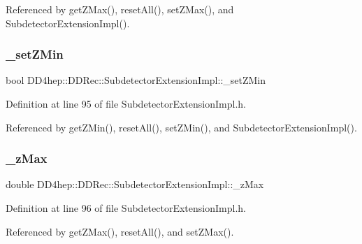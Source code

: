 Referenced by get\+Z\+Max(), reset\+All(), set\+Z\+Max(), and Subdetector\+Extension\+Impl().

\hypertarget{class_d_d4hep_1_1_d_d_rec_1_1_subdetector_extension_impl_a7f2f6db8f2c5f98b732bcea3a452a12f}{}\label{class_d_d4hep_1_1_d_d_rec_1_1_subdetector_extension_impl_a7f2f6db8f2c5f98b732bcea3a452a12f} 
\subsubsection{\texorpdfstring{\+\_\+set\+Z\+Min}{\_setZMin}}
{\footnotesize\ttfamily bool D\+D4hep\+::\+D\+D\+Rec\+::\+Subdetector\+Extension\+Impl\+::\+\_\+set\+Z\+Min\hspace{0.3cm}{\ttfamily [protected]}}



Definition at line 95 of file Subdetector\+Extension\+Impl.\+h.



Referenced by get\+Z\+Min(), reset\+All(), set\+Z\+Min(), and Subdetector\+Extension\+Impl().

\hypertarget{class_d_d4hep_1_1_d_d_rec_1_1_subdetector_extension_impl_aa8e755cc627d81013fb4e3501fdbe172}{}\label{class_d_d4hep_1_1_d_d_rec_1_1_subdetector_extension_impl_aa8e755cc627d81013fb4e3501fdbe172} 
\subsubsection{\texorpdfstring{\+\_\+z\+Max}{\_zMax}}
{\footnotesize\ttfamily double D\+D4hep\+::\+D\+D\+Rec\+::\+Subdetector\+Extension\+Impl\+::\+\_\+z\+Max\hspace{0.3cm}{\ttfamily [protected]}}



Definition at line 96 of file Subdetector\+Extension\+Impl.\+h.



Referenced by get\+Z\+Max(), reset\+All(), and set\+Z\+Max().

